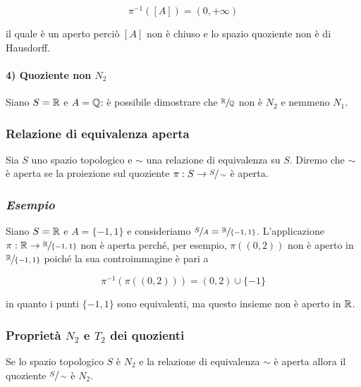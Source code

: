 \begin{equation}
	\pi^{-1} ([A]) = (0,+\infty)
\end{equation}

il quale è un aperto perciò $ [A] $ non è chiuso e lo spazio quoziente non è di Hausdorff.

\paragraph{4) Quoziente non $ N_{2} $}

Siano $ S = \mathbb{R} $ e $ A = \mathbb{Q} $: è possibile dimostrare che $ \sfrac{\mathbb{R}}{\mathbb{Q}} $ non è $ N_{2} $ e nemmeno $ N_{1} $.

\subsubsection{Relazione di equivalenza aperta}

Sia $ S $ uno spazio topologico e $ \sim $ una relazione di equivalenza su $ S $. Diremo che $ \sim $ è aperta se la proiezione sul quoziente $ \pi : S \to \sfrac{S}{\sim} $ è aperta.

\subsubsection{\textit{Esempio}}

Siano $ S = \mathbb{R} $ e $ A = \{-1,1\} $ e consideriamo $ \sfrac{S}{A} = \sfrac{\mathbb{R}}{\{-1,1\}} $. L'applicazione $ \pi : \mathbb{R} \to \sfrac{\mathbb{R}}{\{-1,1\}} $ non è aperta perché, per esempio, $ \pi((0,2)) $ non è aperto in $ \sfrac{\mathbb{R}}{\{-1,1\}} $ poiché la sua controimmagine è pari a

\begin{equation}
	\pi^{-1}(\pi((0,2))) = (0,2) \cup \{-1\}
\end{equation}

in quanto i punti $ \{-1,1\} $ sono equivalenti, ma questo insieme non è aperto in $ \mathbb{R} $.

\subsubsection{Proprietà $ N_{2} $ e $ T_{2} $ dei quozienti}

\begin{definition}\label{prop-n2}
	Se lo spazio topologico $ S $ è $ N_{2} $ e la relazione di equivalenza $ \sim $ è aperta allora il quoziente $ \sfrac{S}{\sim} $ è $ N_{2} $.
\end{definition}

